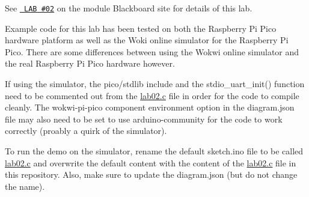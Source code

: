 See \href{https://tcd.blackboard.com/webapps/assignment/uploadAssignment?content_id=_2127028_1&course_id=_71874_1&group_id=&mode=cpview}{\texttt{ LAB \#02}} on the module Blackboard site for details of this lab.

Example code for this lab has been tested on both the Raspberry Pi Pico hardware platform as well as the Woki online simulator for the Raspberry Pi Pico. There are some differences between using the Wokwi online simulator and the real Raspberry Pi Pico hardware however.

If using the simulator, the {\ttfamily pico/stdlib} include and the {\ttfamily stdio\+\_\+uart\+\_\+init()} function need to be commented out from the {\ttfamily \mbox{\hyperlink{lab02_8c}{lab02.\+c}}} file in order for the code to compile cleanly. The {\ttfamily wokwi-\/pi-\/pico} component environment option in the {\ttfamily diagram.\+json} file may also need to be set to use {\ttfamily arduino-\/community} for the code to work correctly (proably a quirk of the simulator).

To run the demo on the simulator, rename the default {\ttfamily sketch.\+ino} file to be called {\ttfamily \mbox{\hyperlink{lab02_8c}{lab02.\+c}}} and overwrite the default content with the content of the {\ttfamily \mbox{\hyperlink{lab02_8c}{lab02.\+c}}} file in this repository. Also, make sure to update the {\ttfamily diagram.\+json} (but do not change the name). 